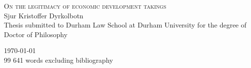 \begin{titlepage}

\begin{center}



\vspace*{\fill}
\centering

{\Huge\textsc{On the legitimacy of economic development takings}}\\[3cm]


{\huge Sjur Kristoffer Dyrkolbotn}\\

\large {Thesis submitted to Durham Law School at Durham University for the degree of Doctor of Philosophy} \\

\vspace*{\fill}

 

\vfill

{\Large \today}\\
{99 641 words excluding bibliography}

\end{center}

\end{titlepage}
